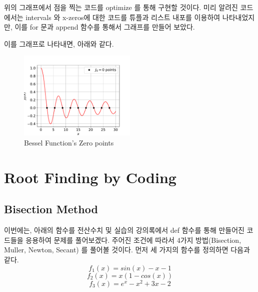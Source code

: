 \documentclass[11pt]{article}
\begin{document}
\noindent
 위의 그래프에서 점을 찍는 코드를 optimize 를 통해 구현할 것이다. 미리 알려진 코드에서는 intervals 와 x-zeros에 대한 코드를 튜플과 리스트 내포를 이용하여 나타내었지만, 이를 for 문과 append 함수를 통해서 그래프를 만들어 보았다.
 
\vspace{5mm}

\vspace{5mm}

\noindent
이를 그래프로 나타내면, 아래와 같다.

\begin{figure}[!ht]
  \centering
  \includegraphics[width=0.5\textwidth]{Zeros_of_Bessel_Fuctions_Homework1.pdf}
  \caption{Bessel Function's Zero points}
\end{figure}
\clearpage














\section{Root Finding by Coding}
\subsection{Bisection Method} 
\noindent
이번에는, 아래의 함수를 전산수치 및 실습의 강의록에서 def 함수를 통해 만들어진 코드들을 응용하여 문제를 풀어보겠다. 주어진 조건에 따라서 4가지 방법(Bisection, Muller, Newton, Secant) 를 풀어볼 것이다. 먼저 세 가지의 함수를 정의하면 다음과 같다. 
\begin{equation}
f_1(x) = sin(x) - x - 1
\end{equation}
\begin{equation}
f_2(x) = x(1 - cos(x))
\end{equation}
\begin{equation}
f_3(x) = e^{x} - x^2 + 3x - 2 
\end{equation}
\end{document}
